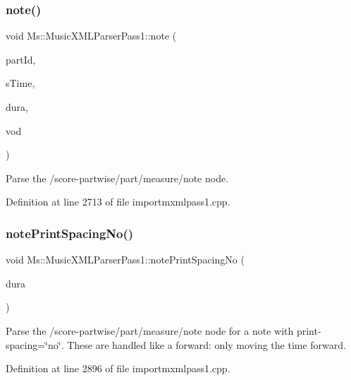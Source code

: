 \subsubsection{\texorpdfstring{note()}{note()}}
{\footnotesize\ttfamily void Ms\+::\+Music\+X\+M\+L\+Parser\+Pass1\+::note (\begin{DoxyParamCaption}\item[{const Q\+String \&}]{part\+Id,  }\item[{const \hyperlink{class_ms_1_1_fraction}{Fraction}}]{s\+Time,  }\item[{\hyperlink{class_ms_1_1_fraction}{Fraction} \&}]{dura,  }\item[{\hyperlink{class_ms_1_1_voice_overlap_detector}{Voice\+Overlap\+Detector} \&}]{vod }\end{DoxyParamCaption})}

Parse the /score-\/partwise/part/measure/note node. 

Definition at line 2713 of file importmxmlpass1.\+cpp.

\mbox{\label{class_ms_1_1_music_x_m_l_parser_pass1_a49918520d96cdff24a634c35cae34331}} 
\subsubsection{\texorpdfstring{note\+Print\+Spacing\+No()}{notePrintSpacingNo()}}
{\footnotesize\ttfamily void Ms\+::\+Music\+X\+M\+L\+Parser\+Pass1\+::note\+Print\+Spacing\+No (\begin{DoxyParamCaption}\item[{\hyperlink{class_ms_1_1_fraction}{Fraction} \&}]{dura }\end{DoxyParamCaption})}

Parse the /score-\/partwise/part/measure/note node for a note with print-\/spacing=\char`\"{}no\char`\"{}. These are handled like a forward\+: only moving the time forward. 

Definition at line 2896 of file importmxmlpass1.\+cpp.

\mbox{\label{class_ms_1_1_music_x_m_l_parser_pass1_a0c2e8987c30de0d646eef05e6ea7b7ec}} 
